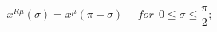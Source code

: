 \begin{equation}\label{eq10.2.ps}
x^{R\mu}(\sigma)=x^{\mu}(\pi-\sigma)~~~~~~for~~0\leq\sigma\leq \frac{\pi}{2};
\end{equation}

